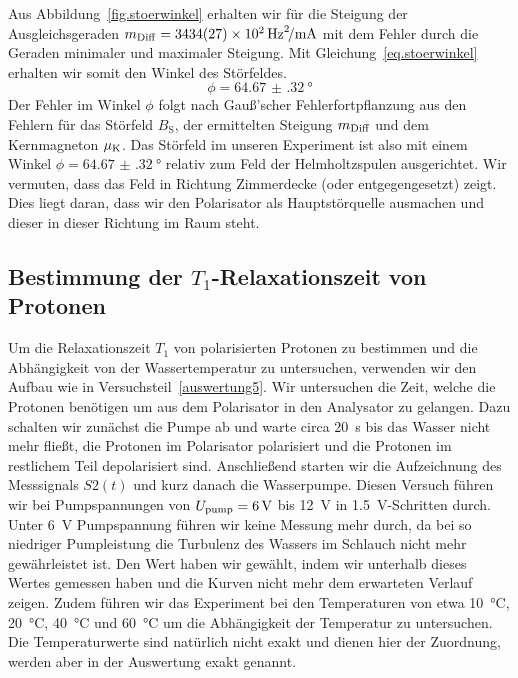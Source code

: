 \documentclass[paper=a4,
	fontsize=10pt,
	DIV=18,
	twocolumn,
	parskip=half
	]{scrartcl}
\numberwithin{equation}{section}    %
\begin{document}
Aus Abbildung~\ref{fig.stoerwinkel} erhalten wir für die Steigung der Ausgleichsgeraden $m_{\rm Diff} = \SI[per-mode=symbol]{3434(27)e2}{\hertz\squared\per\milli\ampere}$ mit dem Fehler durch die Geraden minimaler und maximaler Steigung.
Mit Gleichung~\eqref{eq.stoerwinkel} erhalten wir somit den Winkel des Störfeldes.
\begin{equation}
	\phi = \SI{64.67(32)}{\degree}
\end{equation}
Der Fehler im Winkel $\phi$ folgt nach Gauß'scher Fehlerfortpflanzung aus den Fehlern für das Störfeld $B_\mathrm{S}$, der ermittelten Steigung $m_{\rm Diff}$ und dem Kernmagneton $\mu_{\rm K}$. Das Störfeld im unseren Experiment ist also mit einem Winkel $\phi = \SI{64.67(32)}{\degree}$ relativ zum Feld der Helmholtzspulen ausgerichtet. Wir vermuten, dass das Feld in Richtung Zimmerdecke (oder entgegengesetzt) zeigt. Dies liegt daran, dass wir den Polarisator als Hauptstörquelle ausmachen und dieser in dieser Richtung im Raum steht.

\subsection{Bestimmung der $T_1$-Relaxationszeit von Protonen}
\label{auswertung7}

Um die Relaxationszeit $T_1$ von polarisierten Protonen zu bestimmen und die Abhängigkeit von der Wassertemperatur zu untersuchen, verwenden wir den Aufbau wie in Versuchsteil~\ref{auswertung5}. Wir untersuchen die Zeit, welche die Protonen benötigen um aus dem Polarisator in den Analysator zu gelangen. Dazu schalten wir zunächst die Pumpe ab und warte circa \SI{20}{\second} bis das Wasser nicht mehr fließt, die Protonen im Polarisator polarisiert und die Protonen im restlichem Teil depolarisiert sind. Anschließend starten wir die Aufzeichnung des Messsignals $S2(t)$ und kurz danach die Wasserpumpe. Diesen Versuch führen wir bei Pumpspannungen von $U_{\rm pump}=\SI{6}{\volt}$ bis \SI{12}{\volt} in \SI{1.5}{\volt}-Schritten durch. Unter \SI{6}{\volt} Pumpspannung führen wir keine Messung mehr durch, da bei so niedriger Pumpleistung die Turbulenz des Wassers im Schlauch nicht mehr gewährleistet ist. Den Wert haben wir gewählt, indem wir unterhalb dieses Wertes gemessen haben und die Kurven nicht mehr dem erwarteten Verlauf zeigen. Zudem führen wir das Experiment bei den Temperaturen von etwa \SI{10}{\celsius}, \SI{20}{\celsius}, \SI{40}{\celsius} und \SI{60}{\celsius} um die Abhängigkeit der Temperatur zu untersuchen. Die Temperaturwerte sind natürlich nicht exakt und dienen hier der Zuordnung, werden aber in der Auswertung exakt genannt.
\end{document}
